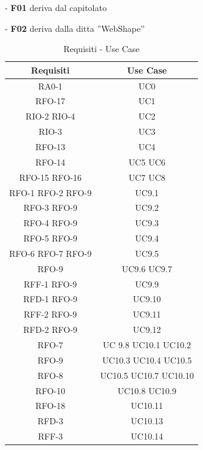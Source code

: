 \begin{elencopuntato}[\subsecindent]    
\item[-] \textbf{F01} deriva dal capitolato 
\item[-] \textbf{F02} deriva dalla ditta ''WebShape''
\end{elencopuntato}

\newpage

\begin{table}[h]
\begin{center}
     \begin{tabular}
           {@{\extracolsep{\fill}}|c|c|}
     \hline
      \textbf{Requisiti} & \textbf{Use Case} \\
      \hline
     RA0-1 & UC0 \\
     \hline
     RFO-17 & UC1  \\
     \hline
     RIO-2  RIO-4 & UC2\\
     \hline
     RIO-3 & UC3 \\
     \hline
     RFO-13 & UC4 \\
     \hline
     RFO-14 & UC5 UC6 \\
      \hline
     RFO-15 RFO-16 & UC7 UC8 \\
     \hline
     RFO-1 RFO-2 RFO-9 & UC9.1 \\
     \hline
     RFO-3 RFO-9 &  UC9.2 \\
     \hline
     RFO-4 RFO-9 & UC9.3 \\
     \hline
     RFO-5 RFO-9 & UC9.4 \\
     \hline
     RFO-6 RFO-7 RFO-9 & UC9.5 \\
     \hline
     RFO-9 & UC9.6 UC9.7 \\
     \hline
     RFF-1 RFO-9 & UC9.9 \\
     \hline
     RFD-1 RFO-9 & UC9.10 \\
     \hline
     RFF-2 RFO-9 & UC9.11 \\
     \hline 
     RFD-2 RFO-9 & UC9.12 \\
     \hline
     RFO-7 & UC 9.8 UC10.1 UC10.2 \\
     \hline
     RFO-9 & UC10.3 UC10.4 UC10.5 \\
     \hline
     RFO-8 & UC10.5 UC10.7 UC10.10 \\
     \hline
     RFO-10 & UC10.8 UC10.9 \\
     \hline
     RFO-18 & UC10.11 \\
     \hline
     RFD-3 & UC10.13 \\
     \hline
     RFF-3 & UC10.14 \\
     
    \hline %
    \end{tabular}
  \caption{Requisiti - Use Case} %
  \label{tab:requisiti}
  \end{center}
\end{table}
